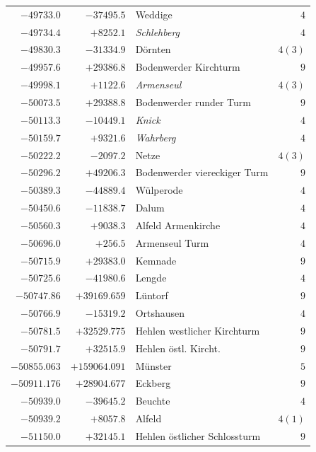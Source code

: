 \begin{center}
\begin{tabular}{r|r|p{170pt}|r}
\(-49733.0\)&\(-37495.5\)&Weddige&\(4\)\\
\(-49734.4\)&\(+8252.1\)&\textit{Schlehberg}&\(4\)\\
\(-49830.3\)&\(-31334.9\)&Dörnten&\(4 (3)\)\\
\(-49957.6\)&\(+29386.8\)&Bodenwerder Kirchturm&\(9\)\\
\(-49998.1\)&\(+1122.6\)&\textit{Armenseul}&\(4 (3)\)\\
\(-50073.5\)&\(+29388.8\)&Bodenwerder runder Turm&\(9\)\\
\(-50113.3\)&\(-10449.1\)&\textit{Knick}&\(4\)\\
\(-50159.7\)&\(+9321.6\)&\textit{Wahrberg}&\(4\)\\
\(-50222.2\)&\(-2097.2\)&Netze&\(4 (3)\)\\
\(-50296.2\)&\(+49206.3\)&Bodenwerder viereckiger Turm&\(9\)\\
\(-50389.3\)&\(-44889.4\)&Wülperode&\(4\)\\
\(-50450.6\)&\(-11838.7\)&Dalum&\(4\)\\
\(-50560.3\)&\(+9038.3\)&Alfeld Armenkirche&\(4\)\\
\(-50696.0\)&\(+256.5\)&Armenseul Turm&\(4\)\\
\(-50715.9\)&\(+29383.0\)&Kemnade&\(9\)\\
\(-50725.6\)&\(-41980.6\)&Lengde&\(4\)\\
\(-50747.86\)&\(+39169.659\)&Lüntorf&\(9\)\\
\(-50766.9\)&\(-15319.2\)&Ortshausen&\(4\)\\
\(-50781.5\)&\(+32529.775\)&Hehlen westlicher Kirchturm&\(9\)\\
\(-50791.7\)&\(+32515.9\)&Hehlen östl. Kircht.&\(9\)\\
\(-50855.063\)&\(+159064.091\)&Münster&\(5\)\\
\(-50911.176\)&\(+28904.677\)&Eckberg&\(9\)\\
\(-50939.0\)&\(-39645.2\)&Beuchte&\(4\)\\
\(-50939.2\)&\(+8057.8\)&Alfeld&\(4 (1)\)\\
\(-51150.0\)&\(+32145.1\)&Hehlen östlicher Schlossturm&\(9\)\\
\hline\end{tabular}\endgroup\end{center}
\clearpage
